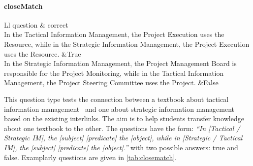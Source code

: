 \documentclass{IOS-Book-Article}     %
\begin{document}
\paragraph{closeMatch}
\begin{table}[h]
\begin{tabulary}{\textwidth}{Ll}
\toprule
question	& correct\\
\midrule
In the Tactical Information Management, the Project Execution uses the Resource, while in the Strategic Information Management, the Project Execution uses the Resource.											&True \\
In the Strategic Information Management, the Project Management Board is responsible for  the Project Monitoring, while in the Tactical Information Management, the Project Steering Committee uses the Project.	&False \\
\bottomrule
\end{tabulary}
\caption{Examples of generated \emph{closeMatch}-questions.}
\label{tab:closematch}
\end{table}

This question type tests the connection between a textbook about tactical information management~\cite{ob} and one about strategic information management~\cite{bb} based on the existing  interlinks.
The aim is to help students transfer knowledge about one textbook to the other.
The questions have the form: \emph{\enquote{In [Tactical / Strategic IM], the [subject] [predicate] the [object], while in [Strategic / Tactical IM], the [subject] [predicate] the [object].}} with two possible answers: true and false.
Examplarly questions are given in \cref{tab:closematch}.

\end{document}
